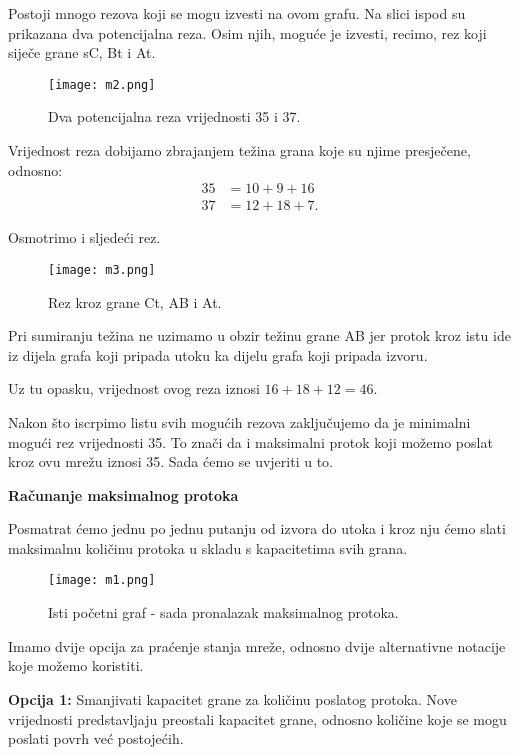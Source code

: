 \documentclass[11pt, a4paper]{article}
\begin{document}
	Postoji mnogo rezova koji se mogu izvesti na ovom grafu. Na slici ispod su prikazana dva potencijalna reza. Osim njih, moguće je izvesti, recimo, rez koji siječe grane sC, Bt i At.
	
	\begin{figure}[h]
		\centering
		\texttt{[image: m2.png]}
		\caption{Dva potencijalna reza vrijednosti 35 i 37.}
		\label{fig:m2}
	\end{figure}
	
	Vrijednost reza dobijamo zbrajanjem težina grana koje su njime presječene, odnosno: 
	\begin{align*}
		35 &= 10 + 9 + 16\\
		37 &= 12 + 18 + 7.
	\end{align*}
	
	Osmotrimo i sljedeći rez.
	\begin{figure}[h]
		\centering
		\texttt{[image: m3.png]}
		\caption{Rez kroz grane Ct, AB i At.}
		\label{fig:m3}
	\end{figure}
	
	Pri sumiranju težina ne uzimamo u obzir težinu grane AB jer protok kroz istu ide iz dijela grafa koji pripada utoku ka dijelu grafa koji pripada izvoru.
	
	Uz tu opasku, vrijednost ovog reza iznosi $ 16 + 18 + 12 = 46 $.
	
	Nakon što iscrpimo listu svih mogućih rezova zaključujemo da je minimalni mogući rez vrijednosti 35. To znači da i maksimalni protok koji možemo poslat kroz ovu mrežu iznosi 35. Sada ćemo se uvjeriti u to.

	\textbf{Računanje maksimalnog protoka}
	
	Posmatrat ćemo jednu po jednu putanju od izvora do utoka i kroz nju ćemo slati maksimalnu količinu protoka u skladu s kapacitetima svih grana.
	
	\begin{figure}[h]
		\centering
		\texttt{[image: m1.png]}
		\caption{Isti početni graf - sada pronalazak maksimalnog protoka.}
		\label{fig:m11}
	\end{figure}
	
	Imamo dvije opcija za praćenje stanja mreže, odnosno dvije alternativne notacije koje možemo koristiti.
	
	\textbf{Opcija 1:} Smanjivati kapacitet grane za količinu poslatog protoka. Nove vrijednosti predstavljaju preostali kapacitet grane, odnosno količine koje se mogu poslati povrh već postojećih.
	
\end{document}
